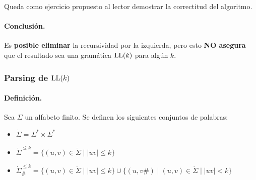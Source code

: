 Queda como ejercicio propuesto al lector demostrar la correctitud del algoritmo.

\vspace{-10pt}
\paragraph{Conclusión.} Es \textbf{posible eliminar} la recursividad por la izquierda, pero esto \textbf{NO asegura} que el resultado sea una gramática $\text{LL}(k)$ para algún $k$.

\subsubsection[Parsing de LL(k)]{Parsing de $\text{LL}(k)$}

\paragraph{Definición.} Sea $\Sigma$ un alfabeto finito. Se definen los siguientes conjuntos de palabras:
\begin{itemize}
    \item $\dot{\Sigma}= \Sigma^* \times \Sigma^*$
    \item $\dot{\Sigma}^{\le k} = \{ (u,v) \in \dot{\Sigma} \mid |uv| \le k \}$
    \item $\dot{\Sigma}_{\#}^{\le k} = \{ (u,v) \in \dot{\Sigma} \mid |uv| \le k \} \cup \{ (u,v\#) \mid (u,v) \in \dot{\Sigma} \mid |uv| < k \}$
\end{itemize}

